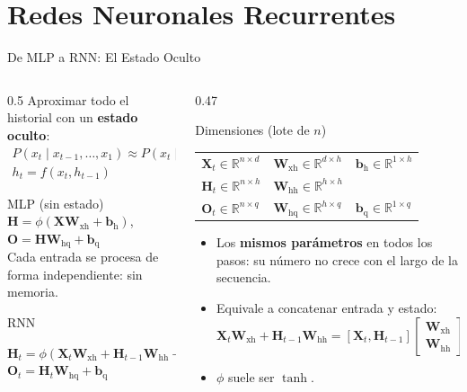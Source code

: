 \documentclass[aspectratio=169, 10pt]{beamer}
\providecommand{\R}{\mathbb{R}}
\newcommand{\W}[1]{\mathbf{W}_{\textrm{#1}}}
\newcommand{\bvec}[1]{\mathbf{b}_{\textrm{#1}}}
\newcommand{\formula}[1]{%
	\begin{tcolorbox}[colback=UCMBlue!8, colframe=UCMBlue, arc=4pt,
		boxsep=2pt, left=6pt, right=6pt, top=3pt, bottom=3pt]
		#1
	\end{tcolorbox}
}
\begin{document}
\section{Redes Neuronales Recurrentes}

\begin{frame}[shrink]{De MLP a RNN: El Estado Oculto}

	\begin{columns}[T]
		\begin{column}{0.5\textwidth}
			\small
			Aproximar todo el historial con un \textbf{estado oculto}:
			\begin{gather*}
				P(x_t \mid x_{t-1},\ldots,x_1) \approx P(x_t \mid h_{t-1}),\\ h_t = f(x_t, h_{t-1})
			\end{gather*}

			\begin{block}{MLP (sin estado)}
				\small
				$\mathbf{H} = \phi(\mathbf{X}\W{xh} + \bvec{h})$, \quad $\mathbf{O} = \mathbf{H}\W{hq} + \bvec{q}$\\
				Cada entrada se procesa de forma independiente: sin memoria.
			\end{block}

			\begin{block}{RNN}
				\formula{\small $\mathbf{H}_t = \phi(\mathbf{X}_t\W{xh} + \mathbf{H}_{t-1}\W{hh} + \bvec{h})$\\[3pt]
					$\mathbf{O}_t = \mathbf{H}_t\W{hq} + \bvec{q}$}
			\end{block}
		\end{column}

		\begin{column}{0.47\textwidth}
			\begin{block}{Dimensiones (lote de $n$)}
				\scriptsize
				\begin{tabular}{@{}lll@{}}
					$\mathbf{X}_t \in \R^{n\times d}$ & $\W{xh} \in \R^{d\times h}$ & $\bvec{h} \in \R^{1\times h}$ \\
					$\mathbf{H}_t \in \R^{n\times h}$ & $\W{hh} \in \R^{h\times h}$ & \\
					$\mathbf{O}_t \in \R^{n\times q}$ & $\W{hq} \in \R^{h\times q}$ & $\bvec{q} \in \R^{1\times q}$
				\end{tabular}
			\end{block}

			\begin{itemize}
				\small
				\item Los \textbf{mismos par\'ametros} en todos los pasos: su n\'umero no crece con el largo de la secuencia.
				\item Equivale a concatenar entrada y estado:
				      \[\scriptstyle \mathbf{X}_t\W{xh} + \mathbf{H}_{t-1}\W{hh} = [\mathbf{X}_t, \mathbf{H}_{t-1}]\left[\begin{smallmatrix}\W{xh}\\ \W{hh}\end{smallmatrix}\right]\]
				\item $\phi$ suele ser $\tanh$.
			\end{itemize}
		\end{column}
	\end{columns}


\end{frame}
\end{document}
